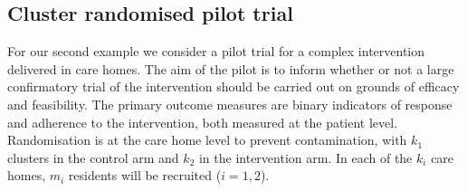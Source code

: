 \documentclass{article} %
\begin{document}


\subsection{Cluster randomised pilot trial}

For our second example we consider a pilot trial for a complex intervention delivered in care homes. The aim of the pilot is to inform whether or not a large confirmatory trial of the intervention should be carried out on grounds of efficacy and feasibility. The primary outcome measures are binary indicators of response and adherence to the intervention, both measured at the patient level. Randomisation is at the care home level to prevent contamination, with $k_{1}$ clusters in the control arm and $k_{2}$ in the intervention arm. In each of the $k_{i}$ care homes, $m_{i}$ residents will be recruited ($i = 1,2$).
\end{document}
